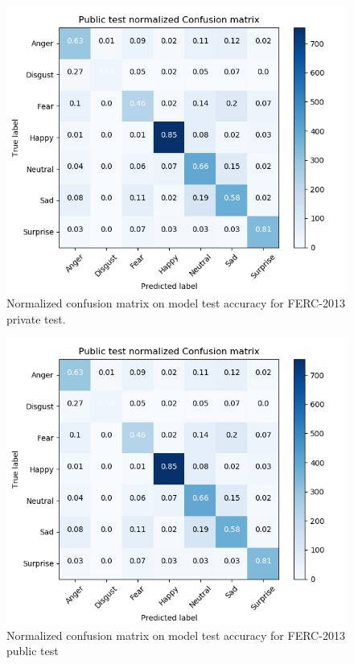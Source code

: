 \documentclass[master]{thesis-uestc}
\begin{document}
\begin{figure}[ht]
\includegraphics[width=5in]{pic/FER-2013_public_test_CM_normalzed.png}
\caption{Normalized confusion matrix on model test accuracy for FERC-2013 private test.}
\label{fig_ferpr_cm_scores}
\end{figure}

\begin{figure}[ht]
\includegraphics[width=5in]{pic/FER-2013_public_test_CM_normalzed.png}
\caption{Normalized confusion matrix on model test accuracy for FERC-2013 public test}
\label{fig_ferpub_cm_scores}
\end{figure}
\end{document}
